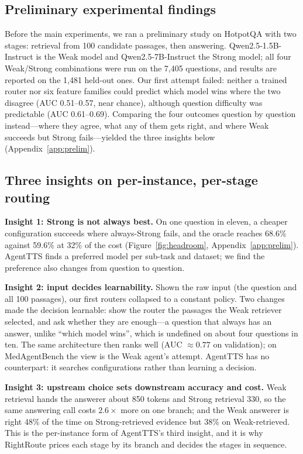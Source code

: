 \documentclass{article}
\begin{document}
\subsection{Preliminary experimental findings}
Before the main experiments, we ran a preliminary study on HotpotQA with two stages: retrieval from 100 candidate passages, then answering. Qwen2.5-1.5B-Instruct is the Weak model and Qwen2.5-7B-Instruct the Strong model; all four Weak/Strong combinations were run on the 7,405 questions, and results are reported on the 1,481 held-out ones. Our first attempt failed: neither a trained router nor six feature families could predict which model wins where the two disagree (AUC 0.51--0.57, near chance), although question difficulty was predictable (AUC 0.61--0.69). Comparing the four outcomes question by question instead---where they agree, what any of them gets right, and where Weak succeeds but Strong fails---yielded the three insights below (Appendix~\ref{app:prelim}).

\subsection{Three insights on per-instance, per-stage routing}
\textbf{Insight 1: Strong is not always best.} On one question in eleven, a cheaper configuration succeeds where always-Strong fails, and the oracle reaches 68.6\% against 59.6\% at 32\% of the cost (Figure~\ref{fig:headroom}, Appendix~\ref{app:prelim}). AgentTTS finds a preferred model per sub-task and dataset; we find the preference also changes from question to question.

\textbf{Insight 2: input decides learnability.} Shown the raw input (the question and all 100 passages), our first routers collapsed to a constant policy. Two changes made the decision learnable: show the router the passages the Weak retriever selected, and ask whether they are enough---a question that always has an answer, unlike ``which model wins'', which is undefined on about four questions in ten. The same architecture then ranks well (AUC ${\approx}0.77$ on validation); on MedAgentBench the view is the Weak agent's attempt. AgentTTS has no counterpart: it searches configurations rather than learning a decision.

\textbf{Insight 3: upstream choice sets downstream accuracy and cost.} Weak retrieval hands the answerer about 850 tokens and Strong retrieval 330, so the same answering call costs $2.6\times$ more on one branch; and the Weak answerer is right 48\% of the time on Strong-retrieved evidence but 38\% on Weak-retrieved. This is the per-instance form of AgentTTS's third insight, and it is why RightRoute prices each stage by its branch and decides the stages in sequence.
\end{document}
